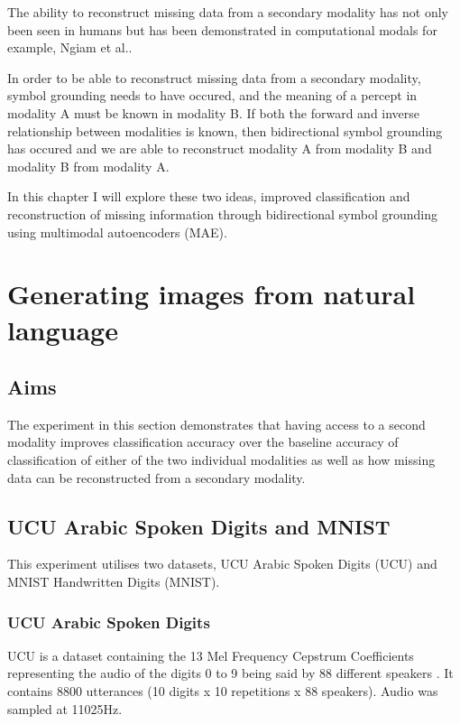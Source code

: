 The ability to reconstruct missing data from a secondary modality has not only been seen in humans \cite{ma2009lip, samuel1997lexical} but has been demonstrated in computational modals for example, Ngiam et al.\cite{ngiam2011multimodal}.

In order to be able to reconstruct missing data from a secondary modality, symbol grounding needs to have occured, and the meaning of a percept in modality A must be known in modality B.
If both the forward and inverse relationship between modalities is known, then bidirectional symbol grounding has occured and we are able to reconstruct modality A from modality B and modality B from modality A.

In this chapter I will explore these two ideas, improved classification and reconstruction of missing information through  bidirectional symbol grounding using multimodal autoencoders (MAE).



\section{Generating images from natural language}
\subsection{Aims}
The experiment in this section demonstrates that having access to a second modality improves classification accuracy over the baseline accuracy of classification of either of the two individual modalities as well as how missing data can be reconstructed from a secondary modality.

\subsection{UCU Arabic Spoken Digits and MNIST} 
\label{sec:UCU}
This experiment utilises two datasets, UCU Arabic Spoken Digits (UCU) and MNIST Handwritten Digits (MNIST).

\subsubsection{UCU Arabic Spoken Digits}
UCU is a dataset containing the 13 Mel Frequency Cepstrum Coefficients representing the audio of the digits 0 to 9 being said by 88 different speakers \cite{hammami2009tree,hammami2010improved}. It contains 8800 utterances (10 digits x 10 repetitions x 88 speakers). Audio was sampled at 11025Hz.

